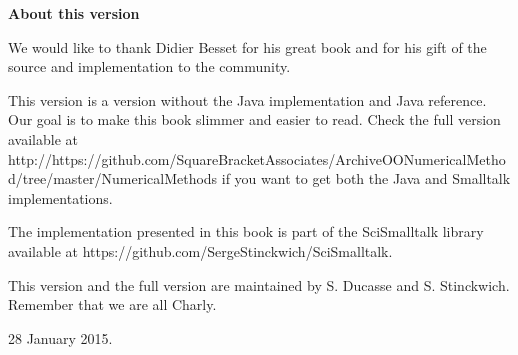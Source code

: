 \documentclass[twoside]{book}
\begin{document}
\fi

\begin{titlepage}
\hbox{\/}\vspace{12 ex} {\Huge \bf About this version}

\vspace{10 ex}
We would like to thank Didier Besset for his great book and for his gift of the source and implementation to the community. 


This version is a version without the Java implementation and Java reference. Our goal is to make this book slimmer and easier to read. Check the full version available at \textsf{http://https://github.com/SquareBracketAssociates/\-ArchiveOONumericalMethod/tree/master/NumericalMethods} if you want to get both the Java and Smalltalk implementations.

The implementation presented in this book is part of the SciSmalltalk library available at
\textsf{https://github.com/SergeStinckwich/SciSmalltalk}. 


This version and the full version are maintained by S. Ducasse and S. Stinckwich.
Remember that we are all Charly.

\vspace{5 ex}
28 January 2015.
\end{titlepage}
\end{document}
